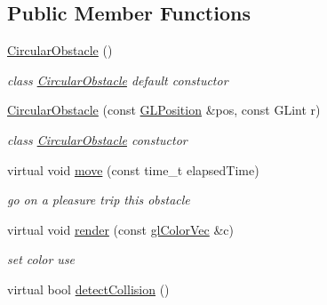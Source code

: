 \subsection*{Public Member Functions}
\begin{DoxyCompactItemize}
\item 
\hyperlink{classCircularObstacle_ad219c09015b786e7e2730b10f9860c26}{Circular\-Obstacle} ()
\begin{DoxyCompactList}\small\item\em class \hyperlink{classCircularObstacle}{Circular\-Obstacle} default constuctor \end{DoxyCompactList}\item 
\hyperlink{classCircularObstacle_a816a0b717d09898e52204298a05b38ad}{Circular\-Obstacle} (const \hyperlink{structGLPosition}{G\-L\-Position} \&pos, const G\-Lint r)
\begin{DoxyCompactList}\small\item\em class \hyperlink{classCircularObstacle}{Circular\-Obstacle} constuctor \end{DoxyCompactList}\item 
\hypertarget{classCircularObstacle_ae1cfdaf0e619db408370cea8472b6a9b}{virtual void \hyperlink{classCircularObstacle_ae1cfdaf0e619db408370cea8472b6a9b}{move} (const time\-\_\-t elapsed\-Time)}\label{classCircularObstacle_ae1cfdaf0e619db408370cea8472b6a9b}

\begin{DoxyCompactList}\small\item\em go on a pleasure trip this obstacle \end{DoxyCompactList}\item 
\hypertarget{classCircularObstacle_a71b41d366d8507a233ffd2f1fc8f3587}{virtual void \hyperlink{classCircularObstacle_a71b41d366d8507a233ffd2f1fc8f3587}{render} (const \hyperlink{Common_8h_a5113b6588451c418d38d8b3681eb6040}{gl\-Color\-Vec} \&c)}\label{classCircularObstacle_a71b41d366d8507a233ffd2f1fc8f3587}

\begin{DoxyCompactList}\small\item\em set color use {\ttfamily } \end{DoxyCompactList}\item 
\hypertarget{classCircularObstacle_ae1cb1117a74485ddbd7ed3c9e846cfa1}{virtual bool \hyperlink{classCircularObstacle_ae1cb1117a74485ddbd7ed3c9e846cfa1}{detect\-Collision} ()}\label{classCircularObstacle_ae1cb1117a74485ddbd7ed3c9e846cfa1}


\end{DoxyCompactItemize}
